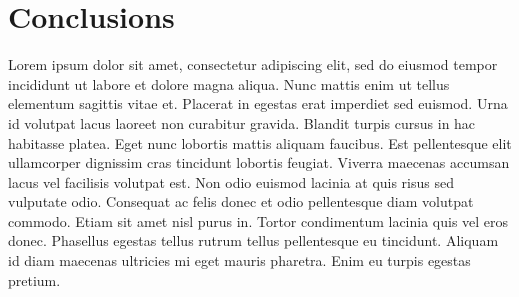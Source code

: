 \chapter*{Conclusions} 

Lorem ipsum dolor sit amet, consectetur adipiscing elit, sed do eiusmod tempor incididunt ut labore et dolore magna aliqua. 
Nunc mattis enim ut tellus elementum sagittis vitae et. Placerat in egestas erat imperdiet sed euismod. Urna id volutpat lacus 
laoreet non curabitur gravida. Blandit turpis cursus in hac habitasse platea. Eget nunc lobortis mattis aliquam faucibus. Est 
pellentesque elit ullamcorper dignissim cras tincidunt lobortis feugiat. Viverra maecenas accumsan lacus vel facilisis volutpat est. 
Non odio euismod lacinia at quis risus sed vulputate odio. Consequat ac felis donec et odio pellentesque diam volutpat commodo. 
Etiam sit amet nisl purus in. Tortor condimentum lacinia quis vel eros donec. Phasellus egestas tellus rutrum tellus pellentesque eu 
tincidunt. Aliquam id diam maecenas ultricies mi eget mauris pharetra. Enim eu turpis egestas pretium.